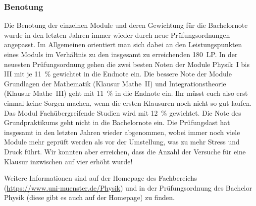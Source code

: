 \begin{multicols}{2}
\subsubsection*{Benotung}
Die Benotung der einzelnen Module und deren Gewichtung für die Bachelornote wurde in den letzten Jahren immer wieder durch neue Prüfungsordnungen angepasst. Im Allgemeinen orientiert man sich dabei an den Leistungspunkten eines Moduls im Verhältnis zu den insgesamt zu erreichenden \SI{180}{LP}. In der neuesten Prüfungsordnung gehen die zwei besten Noten der Module Physik~I bis III mit je \SI{11}{\percent} gewichtet in die Endnote ein. Die bessere Note der Module Grundlagen der Mathematik (Klausur Mathe~II) und Integrationstheorie (Klausur Mathe~III) geht mit \SI{11}{\percent} in die Endnote ein. Ihr müsst euch also erst einmal keine Sorgen machen, wenn die ersten Klausuren noch nicht so gut laufen. Das Modul Fachübergreifende Studien wird mit \SI{12}{\percent} gewichtet. Die Note des Grundpraktikums geht nicht in die Bachelornote ein. Die Prüfungslast hat insgesamt in den letzten Jahren wieder abgenommen, wobei immer noch viele Module mehr geprüft werden als vor der Umstellung, was zu mehr Stress und Druck führt. Wir konnten aber erreichen, dass die Anzahl der Versuche für eine Klausur inzwischen auf vier erhöht wurde!

Weitere Informationen sind auf der Homepage des Fachbereichs (\url{https://www.uni-muenster.de/Physik}) und in der Prüfungsordnung des Bachelor Physik (diese gibt es auch auf der Homepage) zu finden.

\end{multicols}

